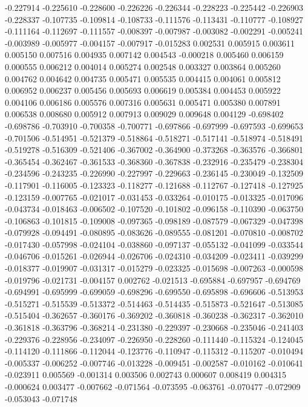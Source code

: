 -0.227914
-0.225610
-0.228600
-0.226226
-0.226344
-0.228223
-0.225442
-0.226903
-0.228337
-0.107735
-0.109814
-0.108733
-0.111576
-0.113431
-0.110777
-0.108927
-0.111164
-0.112697
-0.111557
-0.008397
-0.007987
-0.003082
-0.002291
-0.005241
-0.003989
-0.005977
-0.004157
-0.007917
-0.015283
0.002531
0.005915
0.003611
0.005150
0.007516
0.004935
0.007142
0.004543
-0.000218
0.005460
0.006159
0.000555
0.006212
0.004014
0.005274
0.002548
0.003327
0.003864
0.005260
0.004762
0.004642
0.004735
0.005471
0.005535
0.004415
0.004061
0.005812
0.006952
0.006237
0.005456
0.005693
0.006619
0.005384
0.004453
0.005922
0.004106
0.006186
0.005576
0.007316
0.005631
0.005471
0.005380
0.007891
0.006538
0.008680
0.005912
0.007913
0.009029
0.009648
0.004129
-0.698402
-0.698786
-0.703910
-0.700358
-0.700771
-0.697866
-0.697999
-0.697593
-0.699653
-0.701506
-0.514951
-0.521379
-0.518864
-0.518271
-0.517141
-0.518974
-0.518491
-0.519278
-0.516309
-0.521406
-0.367002
-0.364900
-0.373268
-0.363576
-0.366801
-0.365454
-0.362467
-0.361533
-0.368360
-0.367838
-0.232916
-0.235479
-0.238304
-0.234596
-0.243235
-0.226990
-0.227997
-0.229663
-0.236145
-0.230049
-0.132509
-0.117901
-0.116005
-0.123323
-0.118277
-0.121688
-0.112767
-0.127418
-0.127925
-0.123159
-0.007765
-0.021017
-0.031453
-0.033264
-0.010175
-0.013325
-0.017096
-0.043734
-0.018463
-0.006502
-0.107520
-0.101802
-0.096158
-0.110390
-0.063750
-0.106863
-0.101815
-0.109008
-0.097365
-0.098189
-0.087579
-0.067329
-0.047398
-0.079928
-0.094491
-0.080895
-0.083626
-0.089555
-0.081201
-0.070810
-0.008702
-0.017430
-0.057998
-0.024104
-0.038860
-0.097137
-0.055132
-0.041099
-0.033544
-0.046706
-0.015261
-0.026944
-0.026706
-0.024310
-0.034209
-0.023411
-0.039299
-0.018377
-0.019907
-0.031317
-0.015279
-0.023325
-0.015698
-0.007263
-0.000598
-0.019796
-0.021731
-0.004157
0.002762
-0.021513
-0.695884
-0.697957
-0.694769
-0.694991
-0.695999
-0.699059
-0.698296
-0.699550
-0.695898
-0.696606
-0.513953
-0.515271
-0.515539
-0.513372
-0.514463
-0.514435
-0.515873
-0.521647
-0.513085
-0.515404
-0.362657
-0.360176
-0.369202
-0.360818
-0.360238
-0.362317
-0.362010
-0.361818
-0.363796
-0.368214
-0.231380
-0.229397
-0.230668
-0.235046
-0.241403
-0.229376
-0.228956
-0.234097
-0.226950
-0.228260
-0.111440
-0.115324
-0.124045
-0.114120
-0.111866
-0.112044
-0.123776
-0.110947
-0.115312
-0.115207
-0.010494
-0.005337
-0.006252
-0.007746
-0.013228
-0.009451
-0.002587
-0.010162
-0.010641
-0.023911
0.005569
-0.001314
0.003506
0.002743
0.000607
0.008419
0.004315
-0.000624
0.003477
-0.007662
-0.071564
-0.073595
-0.063761
-0.070477
-0.072909
-0.053043
-0.071748
